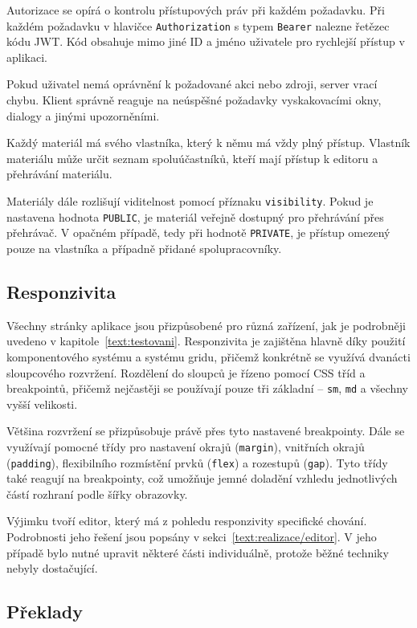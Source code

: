 Autorizace se opírá o kontrolu přístupových práv při každém požadavku. 
Při každém požadavku v hlavičce \texttt{Authorization} s typem \texttt{Bearer} nalezne řetězec kódu JWT.
Kód obsahuje mimo jiné ID a jméno uživatele pro rychlejší přístup v aplikaci.

Pokud uživatel nemá oprávnění k požadované akci nebo zdroji, server vrací chybu. 
Klient správně reaguje na neúspěšné požadavky vyskakovacími okny, dialogy a jinými upozorněními.

Každý materiál má svého vlastníka, který k němu má vždy plný přístup. 
Vlastník materiálu může určit seznam spoluúčastníků, kteří mají přístup k editoru a přehrávání materiálu.

Materiály dále rozlišují viditelnost pomocí příznaku \texttt{visibility}. 
Pokud je nastavena hodnota \texttt{PUBLIC}, je materiál veřejně dostupný pro přehrávání přes přehrávač. 
V opačném případě, tedy při hodnotě \texttt{PRIVATE}, je přístup omezený pouze na vlastníka a případně přidané spolupracovníky.

\subsection{Responzivita}\label{text:realizace/responzivita}


Všechny stránky aplikace jsou přizpůsobené pro různá zařízení, jak je podrobněji uvedeno v kapitole~\ref{text:testovani}. 
Responzivita je zajištěna hlavně díky použití komponentového systému a systému gridu, přičemž konkrétně se využívá dvanácti sloupcového rozvržení. 
Rozdělení do sloupců je řízeno pomocí CSS tříd a breakpointů, přičemž nejčastěji se používají pouze tři základní -- \texttt{sm}, \texttt{md} a všechny vyšší velikosti.

Většina rozvržení se přizpůsobuje právě přes tyto nastavené breakpointy. 
Dále se využívají pomocné třídy pro nastavení okrajů (\texttt{margin}), vnitřních okrajů (\texttt{padding}), flexibilního rozmístění prvků (\texttt{flex}) a rozestupů (\texttt{gap}). 
Tyto třídy také reagují na breakpointy, což umožňuje jemné doladění vzhledu jednotlivých částí rozhraní podle šířky obrazovky.

Výjimku tvoří editor, který má z pohledu responzivity specifické chování. 
Podrobnosti jeho řešení jsou popsány v sekci~\ref{text:realizace/editor}. 
V jeho případě bylo nutné upravit některé části individuálně, protože běžné techniky nebyly dostačující.

\subsection{Překlady}

